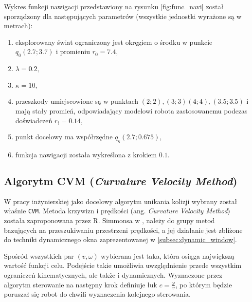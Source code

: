 	Wykres funkcji nawigacji przedstawiony na rysunku \ref{fig:func_navi} został sporządzony dla następujących parametrów (wszystkie jednostki wyrażone są w metrach):
	\begin{enumerate}
	\item eksplorowany świat ograniczony jest okręgiem o środku w punkcie $q_0(2.7;3.7)$ i promieniu $r_0 = 7.4$,
	\item $\lambda = 0.2$,
	\item $\kappa = 10$,
	\item przeszkody umiejscowione są w punktach $(2;2),(3;3)(4;4),(3.5;3.5)$ i mają stały promień, odpowiadający modelowi robota
	zastosowanemu podczas doświadczeń $r_i = 0.14 $,
	\item punkt docelowy ma współrzędne $q_g(2.7;0.675)$,
	\item funkcja nawigacji została wykreślona z krokiem $0.1$.
	\end{enumerate}

\subsection{Algorytm CVM (\textit{Curvature Velocity Method})}
	W pracy inżynierskiej \cite{inzynierka} jako docelowy algorytm unikania kolizji wybrany został właśnie \texttt{CVM}.
	Metoda krzywizn i prędkości (ang. \textit{Curvature Velocity Method}) została zaproponowana przez R. Simmonsa w
	\cite{CVM_2}, należy do grupy metod bazujących na przeszukiwaniu przestrzeni prędkości, a jej działanie
	jest zbliżone do techniki dynamicznego okna zaprezentowanej w \ref{subsec:dynamic_window}.

	Spośród wszystkich par $(v,\omega)$ wybierana jest taka, która osiąga największą wartość funkcji celu.
	Podejście takie umożliwia uwzględnienie przede wszystkim ograniczeń kinematycznych, ale także i dynamicznych.
	Wyznaczone przez algorytm sterowanie na następny krok definiuje łuk $c=\frac{\omega}{v}$, po którym będzie
	poruszał się robot do chwili wyznaczenia kolejnego sterowania.
	
